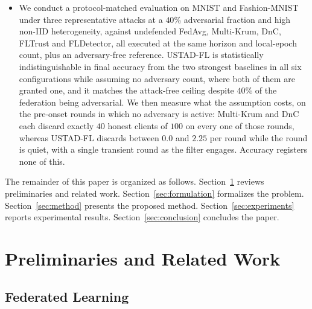 \documentclass[journal]{IEEEtran}
\begin{document}
\begin{itemize}
    \item We conduct a protocol-matched evaluation on MNIST and Fashion-MNIST under three representative attacks at a $40\%$ adversarial fraction and high non-IID heterogeneity, against undefended FedAvg, Multi-Krum, DnC, FLTrust and FLDetector, all executed at the same horizon and local-epoch count, plus an adversary-free reference. USTAD-FL is statistically indistinguishable in final accuracy from the two strongest baselines in all six configurations while assuming no adversary count, where both of them are granted one, and it matches the attack-free ceiling despite $40\%$ of the federation being adversarial. We then measure what the assumption costs, on the pre-onset rounds in which no adversary is active: Multi-Krum and DnC each discard exactly $40$ honest clients of $100$ on every one of those rounds, whereas USTAD-FL discards between $0.0$ and $2.25$ per round while the round is quiet, with a single transient round as the filter engages. Accuracy registers none of this.
\end{itemize}

The remainder of this paper is organized as follows. Section~\ref{sec:preliminaries} reviews preliminaries and related work. Section~\ref{sec:formulation} formalizes the problem. Section~\ref{sec:method} presents the proposed method. Section~\ref{sec:experiments} reports experimental results. Section~\ref{sec:conclusion} concludes the paper.

\section{Preliminaries and Related Work}
\label{sec:preliminaries}

\subsection{Federated Learning}
\end{document}
